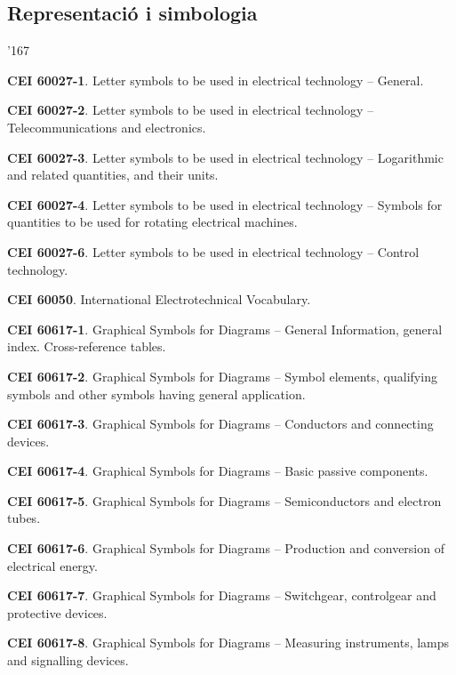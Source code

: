 \subsection*{Representaci\'{o} i simbologia}
\begin{dinglist}{'167}
    \item \textbf{CEI 60027-1}. Letter symbols to be used in electrical technology -- General.
    \item \textbf{CEI 60027-2}. Letter symbols to be used in electrical technology -- Telecommunications and electronics.
    \item \textbf{CEI 60027-3}. Letter symbols to be used in electrical technology -- Logarithmic and related quantities, and their units.
    \item \textbf{CEI 60027-4}. Letter symbols to be used in electrical technology -- Symbols for quantities to be used for rotating electrical machines.
    \item \textbf{CEI 60027-6}. Letter symbols to be used in electrical technology -- Control technology.
    \item \textbf{CEI 60050}. International Electrotechnical Vocabulary. 
    \item \textbf{CEI 60617-1}. Graphical Symbols for Diagrams -- General Information, general index. Cross-reference tables.
    \item \textbf{CEI 60617-2}. Graphical Symbols for Diagrams -- Symbol elements, qualifying symbols and other symbols having general application.
    \item \textbf{CEI 60617-3}. Graphical Symbols for Diagrams -- Conductors and connecting devices.
    \item \textbf{CEI 60617-4}. Graphical Symbols for Diagrams -- Basic passive components.
    \item \textbf{CEI 60617-5}. Graphical Symbols for Diagrams -- Semiconductors and electron tubes.
    \item \textbf{CEI 60617-6}. Graphical Symbols for Diagrams -- Production and conversion of electrical energy.
    \item \textbf{CEI 60617-7}. Graphical Symbols for Diagrams -- Switchgear, controlgear and protective devices.
     \item \textbf{CEI 60617-8}. Graphical Symbols for Diagrams -- Measuring instruments, lamps and signalling devices.

\end{dinglist}
